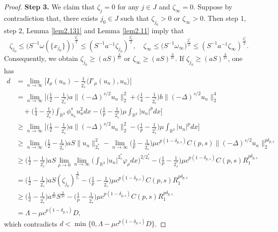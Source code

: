\documentclass[11pt]{article}
\numberwithin{equation}{section}
\begin{document}
\begin{proof}
\noindent\textbf{Step 3.}
 We claim that $\zeta_j=0$ for any $j\in J$ and $\zeta_\infty=0$.
Suppose by contradiction that, there exists $j_0\in J$ such that $\zeta_{j_0}>0$
or $\zeta_\infty>0$. Then step 1, step 2,  Lemma \ref{lem2.131} and
Lemma \ref{lem2.11} imply that
\[  %
\zeta_{j_0}\leq (S^{-1}{\omega{(\{x_{j_0}\}))}}^{\frac{2^*_s}{2}}
\leq(S^{-1}a^{-1}\zeta_{j_0})^{\frac{2^*_s}{2}},\quad
\zeta_\infty \leq (S^{-1}{\omega_\infty)}^{\frac{2^*_s}{2}}
\leq(S^{-1}a^{-1}\zeta_\infty)^{\frac{2^*_s}{2}}.
\]
Consequently, we obtain $\zeta_{j_0}\geq (aS)^{\frac{3}{2s}}$ or
$\zeta_{\infty}\geq (aS)^{\frac{3}{2s}}$.
If $\zeta_{j_0}\geq (aS)^{\frac{3}{2s}}$, one has
\begin{align*}
d&= \lim_{n\to \infty}\Big[I_\mu(u_n)-\frac{1}{2^*_s}
 \langle I'_\mu(u_n), u_n\rangle\Big]\\
&=  \lim_{n\to \infty}\Big[\Big(\frac{1}{2}-\frac{1}{2^*_s}\Big)
 a\|(-\Delta)^{s/2}u_n\|^2_2+\Big(\frac{1}{4}-\frac{1}{2^*_s}\Big)
  b\|(-\Delta)^{s/2}u_n\|^4_2
\\
&\quad +\Big(\frac{1}{4}-\frac{1}{2^*_s}\Big)
 \int_{\mathbb{R}^3}\phi^s_{u_n}u^2_ndx
 -\Big(\frac{1}{p}-\frac{1}{2^*_s}\Big)\mu \int_{\mathbb{R}^3}|u_n|^pdx\Big]\\
&\geq  \lim_{n\to \infty}\Big[\Big(\frac{1}{2}-\frac{1}{2^*_s}\Big)a
 \|(-\Delta)^{s/2}u_n\|^2_2
 -\Big(\frac{1}{p}-\frac{1}{2^*_s}\Big)\mu \int_{\mathbb{R}^3}|u_n|^pdx\Big]\\
&\geq \lim_{n\to \infty}\Big(\frac{1}{2}-\frac{1}{2^*_s}\Big)aS\|u_n\|^2_{2^*_s}
 -\lim_{n\to \infty}\Big(\frac{1}{p}-\frac{1}{2^*_s}\Big)
  \mu c^{p(1-\delta_{p,s})}C(p,s)\|(-\Delta)^{s/2}u_n\|^{p\delta_{p,s}}_2\\
&\geq \Big(\frac{1}{2}-\frac{1}{2^*_s}\Big)
 aS\lim_{\rho\to 0}\lim_{n\to \infty}
 \Big(\int_{\mathbb{R}^3}|u_n|^{2^*_s}\varphi_\rho dx\Big)^{2/2^*_s}
  -\Big(\frac{1}{p}-\frac{1}{2^*_s}\Big)\mu c^{p(1
  -\delta_{p,s})}C(p,s)R_1^{p\delta_{p,s}}\\
&=  \Big(\frac{1}{2}-\frac{1}{2^*_s}\Big)aS(\zeta_{j_0})^\frac{2}{2^*_s}
 -\Big(\frac{1}{p}-\frac{1}{2^*_s}\Big)\mu c^{p(1-\delta_{p,s})}C(p,s)R_1^{p\delta_{p,s}}\\
&\geq  \Big(\frac{1}{2}-\frac{1}{2^*_s}\Big) a^{\frac{3}{2s}}S^{\frac{3}{2s}}
 -\big(\frac{1}{p}-\frac{1}{2^*_s}\Big)\mu c^{p(1-\delta_{p,s})}C(p,s)R_1^{p\delta_{p,s}}\\
&= \Lambda-\mu c^{p(1-\delta_{p,s})}D,
\end{align*}
which contradicts $d<\min\{0, \Lambda-\mu c^{p(1-\delta_{p,s})}D\}$.

\end{proof}
\end{document}
